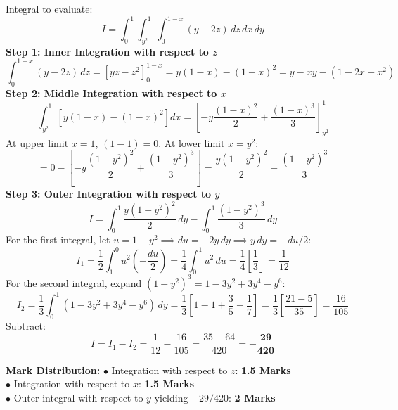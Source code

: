 \begin{solutionbox}
Integral to evaluate:
\[
I = \int_0^1 \int_{y^2}^1 \int_0^{1-x} (y - 2z) \, dz \, dx \, dy
\]
\textbf{Step 1: Inner Integration with respect to $z$}
\[
\int_0^{1-x} (y - 2z) \, dz = \left[ y z - z^2 \right]_0^{1-x} = y(1 - x) - (1 - x)^2 = y - xy - (1 - 2x + x^2)
\]
\textbf{Step 2: Middle Integration with respect to $x$}
\[
\int_{y^2}^1 \left[ y(1 - x) - (1 - x)^2 \right] dx = \left[ -y\frac{(1-x)^2}{2} + \frac{(1-x)^3}{3} \right]_{y^2}^1
\]
At upper limit $x = 1$, $(1-1) = 0$.
At lower limit $x = y^2$:
\[
= 0 - \left[ -y\frac{(1-y^2)^2}{2} + \frac{(1-y^2)^3}{3} \right] = \frac{y(1-y^2)^2}{2} - \frac{(1-y^2)^3}{3}
\]
\textbf{Step 3: Outer Integration with respect to $y$}
\[
I = \int_0^1 \frac{y(1-y^2)^2}{2} \, dy - \int_0^1 \frac{(1-y^2)^3}{3} \, dy
\]
For the first integral, let $u = 1 - y^2 \implies du = -2y \, dy \implies y \, dy = -du/2$:
\[
I_1 = \frac{1}{2} \int_1^0 u^2 \left(-\frac{du}{2}\right) = \frac{1}{4} \int_0^1 u^2 \, du = \frac{1}{4}\left[\frac{1}{3}\right] = \frac{1}{12}
\]
For the second integral, expand $(1-y^2)^3 = 1 - 3y^2 + 3y^4 - y^6$:
\[
I_2 = \frac{1}{3} \int_0^1 (1 - 3y^2 + 3y^4 - y^6) \, dy = \frac{1}{3} \left[ 1 - 1 + \frac{3}{5} - \frac{1}{7} \right] = \frac{1}{3}\left[\frac{21 - 5}{35}\right] = \frac{16}{105}
\]
Subtract:
\[
I = I_1 - I_2 = \frac{1}{12} - \frac{16}{105} = \frac{35 - 64}{420} = \mathbf{-\frac{29}{420}}
\]

\begin{markingrubric}
\textbf{Mark Distribution:}
$\bullet$ Integration with respect to $z$: \textbf{1.5 Marks}\\
$\bullet$ Integration with respect to $x$: \textbf{1.5 Marks}\\
$\bullet$ Outer integral with respect to $y$ yielding $-29/420$: \textbf{2 Marks}
\end{markingrubric}
\end{solutionbox}

